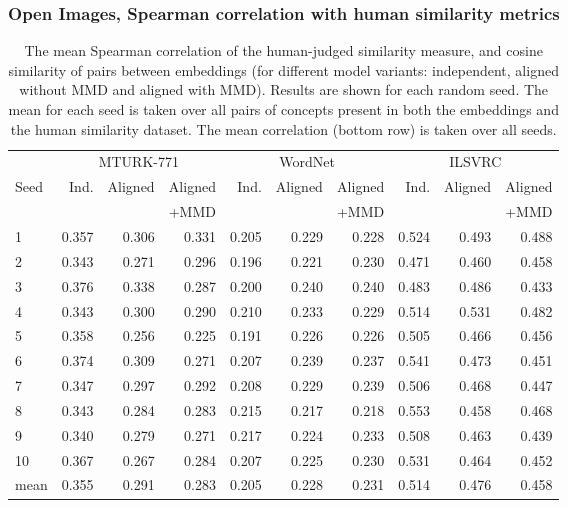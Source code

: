 \subsubsection{Open Images, Spearman correlation with human similarity metrics}
\begin{table}[H]
\centering
\begin{tabular}{lrrrrrrrrr}
  \toprule

\multicolumn{1}{r}{} & \multicolumn{3}{c}{MTURK-771} & \multicolumn{3}{c}{WordNet} & \multicolumn{3}{c}{ILSVRC} \\
\cmidrule(lr){2-4} \cmidrule(lr){5-7} \cmidrule(lr){8-10}
{Seed} &  Ind. &   Aligned &  Aligned  & Ind. &   Aligned &  Aligned  & Ind. &   Aligned &  Aligned   \\
{}     &              &           & +MMD      &            &            & +MMD      &             &           &   +MMD \\
\midrule
1    &     0.357 &  0.306 &   0.331 &     0.205 &  0.229 &    0.228 &   0.524 &  0.493 &  0.488  \\
2    &     0.343 &  0.271 &   0.296 &     0.196 &  0.221 &    0.230 &   0.471 &  0.460 &  0.458  \\
3    &     0.376 &  0.338 &   0.287 &     0.200 &  0.240 &    0.240 &   0.483 &  0.486 &  0.433  \\
4    &     0.343 &  0.300 &   0.290 &     0.210 &  0.233 &    0.229 &   0.514 &  0.531 &  0.482 \\
5    &     0.358 &  0.256 &   0.225 &     0.191 &  0.226 &    0.226 &   0.505 &  0.466 &  0.456  \\
6    &     0.374 &  0.309 &   0.271 &     0.207 &  0.239 &    0.237 &   0.541 &  0.473 &  0.451  \\
7    &     0.347 &  0.297 &   0.292 &     0.208 &  0.229 &    0.239 &   0.506 &  0.468 &  0.447  \\
8    &     0.343 &  0.284 &   0.283 &     0.215 &  0.217 &    0.218 &   0.553 &  0.458 &  0.468  \\
9    &     0.340 &  0.279 &   0.271 &     0.217 &  0.224 &    0.233 &   0.508 &  0.463 &  0.439  \\
10   &     0.367 &  0.267 &   0.284 &     0.207 &  0.225 &    0.230 &   0.531 &  0.464 &  0.452  \\
\midrule                                                                                         
mean &     0.355 &  0.291 &   0.283 &     0.205 &  0.228 &    0.231 &   0.514 &  0.476 &  0.458  \\
\bottomrule
\end{tabular}
\caption{The mean Spearman correlation of the human-judged similarity measure, and cosine similarity of pairs between embeddings (for different model variants: independent, aligned without MMD and aligned with MMD). Results are shown for each random seed. The mean for each seed is taken over all pairs of concepts present in both the embeddings and the human similarity dataset. The mean correlation (bottom row) is taken over all seeds. }
\end{table}


